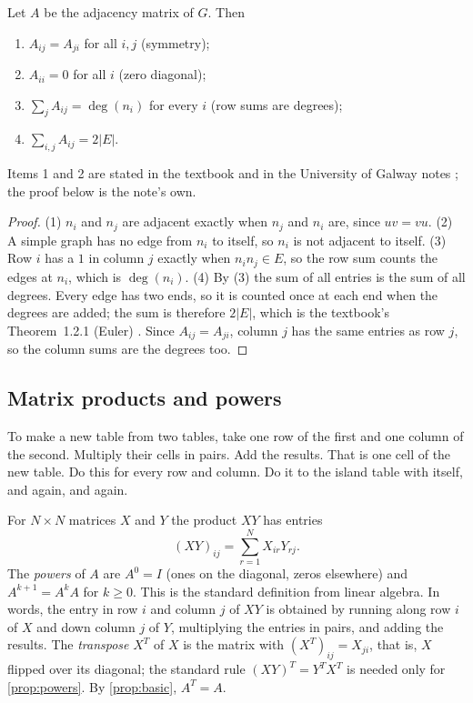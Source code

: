 \begin{proposition}\label{prop:basic}
Let $A$ be the adjacency matrix of $G$. Then
\begin{enumerate}
\item $A_{ij}=A_{ji}$ for all $i,j$ (symmetry);
\item $A_{ii}=0$ for all $i$ (zero diagonal);
\item $\sum_{j}A_{ij}=\deg(n_i)$ for every $i$ (row sums are degrees);
\item $\sum_{i,j}A_{ij}=2|E|$.
\end{enumerate}
\end{proposition}
Items 1 and 2 are stated in the textbook \cite[p.~11]{petrosyan2015graphs}
and in the University of Galway notes \cite[Notes~1 and 2, p.~3]{galwaynotes};
the proof below is the note's own.
\begin{proof}
(1) $n_i$ and $n_j$ are adjacent exactly when $n_j$ and $n_i$ are, since
$uv=vu$. (2) A simple graph has no edge from $n_i$ to itself, so $n_i$ is
not adjacent to itself. (3) Row $i$ has a $1$ in column $j$ exactly when
$n_in_j\in E$, so the row sum counts the edges at $n_i$, which is
$\deg(n_i)$. (4) By (3) the sum of all entries is the sum of all degrees. Every edge has
two ends, so it is counted once at each end when the degrees are added; the
sum is therefore $2|E|$, which is the textbook's Theorem~1.2.1 (Euler)
\cite[Theorem~1.2.1, p.~16]{petrosyan2015graphs}. Since $A_{ij}=A_{ji}$,
column $j$ has the same entries as row $j$, so the column sums are the
degrees too.
\end{proof}

\subsection{Matrix products and powers}

\plainwords{} To make a new table from two tables, take one row of the
first and one column of the second. Multiply their cells in pairs. Add the
results. That is one cell of the new table. Do this for every row and
column. Do it to the island table with itself, and again, and again.

\begin{definition}\label{def:power}
For $N\times N$ matrices $X$ and $Y$ the product $XY$ has entries
\begin{equation}\label{eq:product}
(XY)_{ij}=\sum_{r=1}^{N}X_{ir}Y_{rj}.
\end{equation}
The \emph{powers} of $A$ are $A^0=I$ (ones on the diagonal, zeros
elsewhere) and $A^{k+1}=A^{k}A$ for $k\ge 0$. This is the standard
definition from linear algebra. In words, the entry in row $i$ and column
$j$ of $XY$ is obtained by running along row $i$ of $X$ and down column $j$
of $Y$, multiplying the entries in pairs, and adding the results. The
\emph{transpose} $X^{T}$ of $X$ is the matrix with $(X^{T})_{ij}=X_{ji}$,
that is, $X$ flipped over its diagonal; the standard rule
$(XY)^{T}=Y^{T}X^{T}$ is needed only for \cref{prop:powers}. By
\cref{prop:basic}, $A^{T}=A$.
\end{definition}

